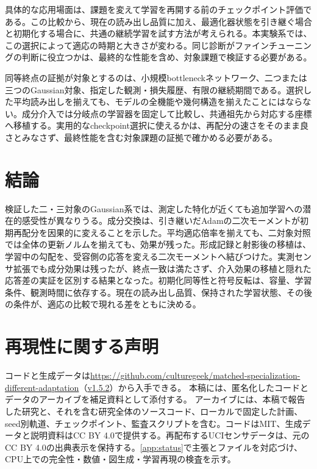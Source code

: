 具体的な応用場面は、課題を変えて学習を再開する前のチェックポイント評価である。この比較から、現在の読み出し品質に加え、最適化器状態を引き継ぐ場合と初期化する場合に、共通の継続学習を試す方法が考えられる。本実験系では、この選択によって適応の時期と大きさが変わる。同じ診断がファインチューニングの判断に役立つかは、最終的な性能を含め、対象課題で検証する必要がある。

同等終点の証拠が対象とするのは、小規模bottleneckネットワーク、二つまたは三つのGaussian対象、指定した観測・損失履歴、有限の継続期間である。選択した平均読み出しを揃えても、モデルの全機能や幾何構造を揃えたことにはならない。成分介入では分岐点の学習器を固定して比較し、共通祖先から対応する座標へ移植する。実用的なcheckpoint選択に使えるかは、再配分の速さをそのまま良さとみなさず、最終性能を含む対象課題の証拠で確かめる必要がある。

\section{結論}
検証した二・三対象のGaussian系では、測定した特化が近くても追加学習への潜在的感受性が異なりうる。成分交換は、引き継いだAdamの二次モーメントが初期再配分を因果的に変えることを示した。平均適応倍率を揃えても、二対象対照では全体の更新ノルムを揃えても、効果が残った。形成記録と射影後の移植は、学習中の勾配を、受容側の応答を変える二次モーメントへ結びつけた。実測センサ拡張でも成分効果は残ったが、終点一致は満たさず、介入効果の移植と隠れた応答差の実証を区別する結果となった。初期化同等性と符号反転は、容量、学習条件、観測時間に依存する。現在の読み出し品質、保持された学習状態、その後の条件が、適応の比較で現れる差をともに決める。

\section*{再現性に関する声明}
\ifpublicrelease
コードと生成データは\url{https://github.com/culturegeek/matched-specialization-different-adaptation}（\href{https://github.com/culturegeek/matched-specialization-different-adaptation/releases/tag/v1.5.2}{v1.5.2}）から入手できる。
\else
本稿には、匿名化したコードとデータのアーカイブを補足資料として添付する。
\fi
アーカイブには、本稿で報告した研究と、それを含む研究全体のソースコード、ローカルで固定した計画、seed別軌道、チェックポイント、監査スクリプトを含む。コードはMIT、生成データと説明資料はCC BY 4.0で提供する。再配布するUCIセンサデータは、元のCC BY 4.0の出典表示を保持する。\ref{app:status}で主張とファイルを対応づけ、CPU上での完全性・数値・図生成・学習再現の検査を示す。


